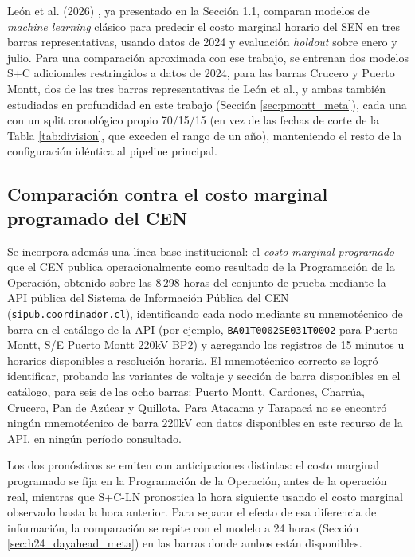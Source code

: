 León et al. (2026) \cite{LeonSMPChile}, ya presentado en la Sección 1.1, comparan modelos de \textit{machine learning} clásico para predecir el costo marginal horario del SEN en tres barras representativas, usando datos de 2024 y evaluación \textit{holdout} sobre enero y julio. Para una comparación aproximada con ese trabajo, se entrenan dos modelos S+C adicionales restringidos a datos de 2024, para las barras Crucero y Puerto Montt, dos de las tres barras representativas de León et al., y ambas también estudiadas en profundidad en este trabajo (Sección \ref{sec:pmontt_meta}), cada una con un split cronológico propio 70/15/15 (en vez de las fechas de corte de la Tabla \ref{tab:division}, que exceden el rango de un año), manteniendo el resto de la configuración idéntica al pipeline principal.

\subsection{Comparación contra el costo marginal programado del CEN}
\label{sec:cen_meta}

Se incorpora además una línea base institucional: el \textit{costo marginal programado} que el CEN publica operacionalmente como resultado de la Programación de la Operación, obtenido sobre las 8\,298 horas del conjunto de prueba mediante la API pública del Sistema de Información Pública del CEN (\texttt{sipub.coordinador.cl}), identificando cada nodo mediante su mnemotécnico de barra en el catálogo de la API (por ejemplo, \texttt{BA01T0002SE031T0002} para Puerto Montt, S/E Puerto Montt 220kV BP2) y agregando los registros de 15 minutos u horarios disponibles a resolución horaria. El mnemotécnico correcto se logró identificar, probando las variantes de voltaje y sección de barra disponibles en el catálogo, para seis de las ocho barras: Puerto Montt, Cardones, Charrúa, Crucero, Pan de Azúcar y Quillota. Para Atacama y Tarapacá no se encontró ningún mnemotécnico de barra 220kV con datos disponibles en este recurso de la API, en ningún período consultado.

Los dos pronósticos se emiten con anticipaciones distintas: el costo marginal programado se fija en la Programación de la Operación, antes de la operación real, mientras que S+C-LN pronostica la hora siguiente usando el costo marginal observado hasta la hora anterior. Para separar el efecto de esa diferencia de información, la comparación se repite con el modelo a 24 horas (Sección \ref{sec:h24_dayahead_meta}) en las barras donde ambos están disponibles.
